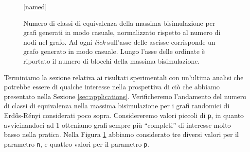 \begin{figure}[b!]
\begin{center}
\begin{subfigure}[b]{0.3\textwidth}
\begin{tikzpicture}[scale=1.3]
            \end{tikzpicture}
        \end{subfigure}
        \begin{subfigure}[b]{0.3\textwidth}
        \end{subfigure}
        \ref*{named}
    \end{center}
    \caption{Numero di classi di equivalenza della massima bisimulazione per grafi generati in modo casuale, normalizzato rispetto al numero di nodi nel grafo. Ad ogni \emph{tick} sull'asse delle ascisse corrisponde un grafo generato in modo casuale. Lungo l'asse delle ordinate è riportato il numero di blocchi della massima bisimulazione.}
    \label{fig:bisi_size}
\end{figure}

Terminiamo la sezione relativa ai risultati sperimentali con un'ultima analisi che potrebbe essere di qualche interesse nella prospettiva di ciò che abbiamo presentato nella Sezione \ref{sec:applications}. Verificheremo l'andamento del numero di classi di equivalenza nella massima bisimulazione per i grafi randomici di Erdős-Rényi considerati poco sopra. Considereremo valori piccoli di \verb|p|, in quanto avvicinandoci ad 1 otteniamo grafi sempre più ``completi'' di interesse molto basso nella pratica. Nella Figura \ref{fig:bisi_size} abbiamo considerato tre diversi valori per il parametro \verb|n|, e quattro valori per il parametro \verb|p|.

